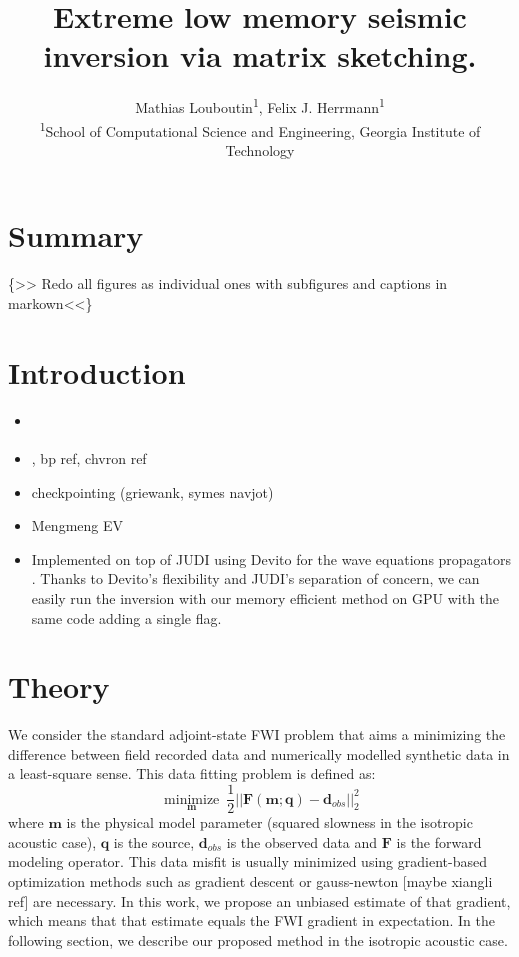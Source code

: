 \documentclass[]{segabs}
\title{Extreme low memory seismic inversion via matrix sketching.}
\author{Mathias Louboutin\textsuperscript{1}, Felix J.
Herrmann\textsuperscript{1}\\\textsuperscript{1}School of Computational
Science and Engineering, Georgia Institute of Technology\\}
\date{}
\begin{document}
\maketitle




\section{Summary}\label{summary}

\{\textgreater{}\textgreater{} Redo all figures as individual ones with
subfigures and captions in markown\textless{}\textless{}\}

\section{Introduction}\label{introduction}

\begin{itemize}
\item
  \citet{louboutin2015segtcs}
\item
  \citet{witte2018cls}, bp ref, chvron ref
\item
  checkpointing (griewank, symes navjot)
\item
  Mengmeng EV
\item
  Implemented on top of JUDI \citep{witte2018alf} using Devito for the
  wave equations propagators
  \citep[\citet{devito-compiler}]{devito-api}. Thanks to Devito's
  flexibility and JUDI's separation of concern, we can easily run the
  inversion with our memory efficient method on GPU with the same code
  adding a single flag.
\end{itemize}

\section{Theory}\label{theory}

We consider the standard adjoint-state FWI problem that aims a
minimizing the difference between field recorded data and numerically
modelled synthetic data in a least-square sense\citep[\citet{tarantola},
\citet{virieux}, \citet{louboutin2017fwi},
\citet{louboutin2017fwip2}]{lionsjl1971}. This data fitting problem is
defined as:
%
\begin{equation}
\underset{\mathbf{m}}{\operatorname{minimize}} \ \frac{1}{2} ||\mathbf{F}(\mathbf{m}; \mathbf{q}) - \mathbf{d}_{obs} ||_2^2
\label{adj}
\end{equation}
%
 where $\mathbf{m}$ is the physical model parameter (squared slowness in
the isotropic acoustic case), $\mathbf{q}$ is the source,
$\mathbf{d}_{obs}$ is the observed data and $\mathbf{F}$ is the forward
modeling operator. This data misfit is usually minimized using
gradient-based optimization methods such as gradient descent
\citep{plessixasfwi} or gauss-newton {[}maybe xiangli ref{]} are
necessary. In this work, we propose an unbiased estimate of that
gradient, which means that that estimate equals the FWI gradient in
expectation. In the following section, we describe our proposed method
in the isotropic acoustic case.
\end{document}
